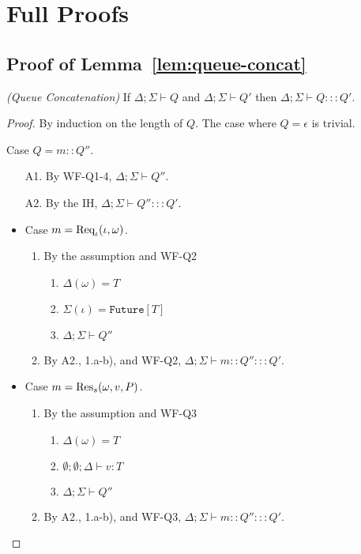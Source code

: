 \section{Full Proofs}

\subsection{Proof of Lemma~\ref{lem:queue-concat}}\label{app:queue-concat}

\begin{lemmaun}
\emph{(Queue Concatenation)}
If $\Delta ; \Sigma \vdash Q$ and $\Delta ; \Sigma \vdash Q'$ then $\Delta ; \Sigma \vdash Q ::: Q'$.
\end{lemmaun}
\begin{proof}
By induction on the length of $Q$. The case where $Q = \epsilon$ is trivial.

Case $Q = m :: Q''$.
\begin{enumerate}
\item[A1.] By WF-Q1-4, $\Delta ; \Sigma \vdash Q''$.
\item[A2.] By the IH, $\Delta ; \Sigma \vdash Q'' ::: Q'$.
\end{enumerate}

\begin{itemize}
\item Case $m = {\textrm{Req}_{\iota}(\iota, \omega)}$.
\begin{enumerate}
\item By the assumption and WF-Q2
  \begin{enumerate}[label=(\alph*)]
  \item $\Delta(\omega) = T$
  \item $\Sigma(\iota) = \texttt{Future}[T]$
  \item $\Delta ; \Sigma \vdash Q''$
  \end{enumerate}
\item By A2., 1.a-b), and WF-Q2, $\Delta ; \Sigma \vdash m :: Q'' ::: Q'$.
\end{enumerate}

\item Case $m = {\textrm{Res}_s(\omega, v, P)}$.
\begin{enumerate}
\item By the assumption and WF-Q3
  \begin{enumerate}[label=(\alph*)]
  \item $\Delta(\omega) = T$
  \item $\emptyset ; \emptyset ; \Delta \vdash v : T$
  \item $\Delta ; \Sigma \vdash Q''$
  \end{enumerate}
\item By A2., 1.a-b), and WF-Q3, $\Delta ; \Sigma \vdash m :: Q'' ::: Q'$.
\end{enumerate}


\end{itemize}
\end{proof}
